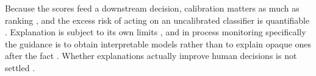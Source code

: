 Because the scores feed a downstream decision, calibration matters as much as ranking
\citep{filho2023classifier}, and the excess risk of acting on an uncalibrated classifier is
quantifiable \citep{perezlebel2025decision}. Explanation is subject to its own limits
\citep{bilodeau2024impossibility,hwang2025shapbased}, and in process monitoring specifically
the guidance is to obtain interpretable models rather than to explain opaque ones after the
fact \citep{stevens2024explainability,mehdiyev2025interpretable,sahatova2026feature}.
Whether explanations actually improve human decisions is not settled
\citep{haag2026explanations,chae2025explanation}.
